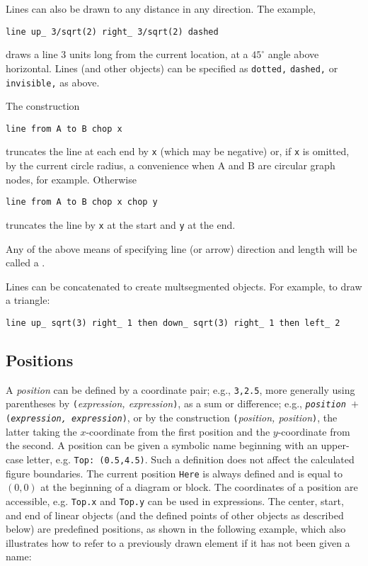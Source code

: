 Lines can also be drawn to any distance in any direction.  The example,

{\tt line up\_ 3/sqrt(2) right\_ 3/sqrt(2) dashed}

\noindent
draws a line 3 units long from the current location,
at a $45^\circ$ angle above horizontal.
Lines (and other objects) can be specified as {\tt dotted,} {\tt dashed,} or
{\tt invisible,} as above.

The construction

{\tt line from A to B chop x}

\noindent
truncates the line at each end by {\tt x} (which may be negative)
or, if {\tt x} is omitted, by
the current circle radius, a convenience when A and B are
circular graph nodes, for example.  Otherwise

{\tt line from A to B chop x chop y}

\noindent
truncates the line by {\tt x} at the start and {\tt y} at the end.

Any of the above means of specifying line (or arrow) direction and length
will be called a \linespec.

Lines can be concatenated to create multsegmented objects.
For example, to draw a triangle:

{\tt line up\_ sqrt(3) right\_ 1 then down\_ sqrt(3) right\_ 1 then left\_ 2}

\subsection{Positions\label{Positions:}}
A {\sl position} can be defined by a coordinate pair;
 e.g., {\tt 3,2.5},
more generally using parentheses by {\tt (}{\sl expression, expression}{\tt )},
as a sum or difference;
 e.g., {\tt{\sl position} $+$ ({\sl expression, expression})},
or by the construction {\tt (}{\sl position, position}{\tt )},
the latter taking the $x$-coordinate from the first
position and the $y$-coordinate from the second.  A position can be
given a symbolic name beginning with an upper-case letter,
e.g. {\tt Top:~(0.5,4.5)}.  Such a definition does not affect the calculated
figure boundaries.  The current position {\tt Here} is always defined and
is equal to $(0,0)$ at the beginning of a diagram or block.
The coordinates of a position are accessible, e.g. {\tt Top.x} and
{\tt Top.y} can be used in expressions.  The center, start, and end of
linear objects (and the defined points of other objects as described below)
are predefined positions, as shown in the following example,
which also illustrates how to refer to a previously drawn element if it has
not been given a name:

